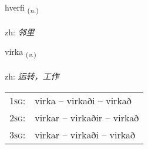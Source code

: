 \documentclass[frontgrid, backgrid]{flacards}\usepackage[]{graphicx}\usepackage[]{color}
\begin{document}
\renewcommand{\flhead}{\vskip5pt \fboxsep=0pt {\small\bfseries\footnotesize Nafnorð | 名词}}
\renewcommand{\fcfoot}{\vskip5pt \fboxsep=0pt \hspace{2pt}{\small\bfseries\footnotesize 2K}}

\renewcommand{\blhead}{\vskip5pt {\small\bfseries\footnotesize Nafnorð | 名词 }}
\renewcommand{\bcfoot}{\vskip5pt \hspace{2pt}{\small\bfseries\footnotesize 2K}}


{hverfi \small{\textsubscript{(\textit{n.})}} \\[1ex] %
\textphonetic{[kʰvɛrvɪ]} \\
zh: \emph{邻里} \\  [2ex]
\renewcommand*{\arraystretch}{0.8}
}

\renewcommand{\flhead}{\vskip5pt \fboxsep=0pt {\small\bfseries\footnotesize Sagnorð | 动词}}
\renewcommand{\fcfoot}{\vskip5pt \fboxsep=0pt \hspace{2pt}{\small\bfseries\footnotesize 2K}}

\renewcommand{\blhead}{\vskip5pt {\small\bfseries\footnotesize Sagnorð | 动词 }}
\renewcommand{\bcfoot}{\vskip5pt \hspace{2pt}{\small\bfseries\footnotesize 2K}}


{virka \small{\textsubscript{(\textit{v.})}} \\[1ex] %
\textphonetic{[vɪr̥ka]} \\
zh: \emph{运转，工作} \\  [2ex]
\renewcommand*{\arraystretch}{0.8}
\begin{tabular}{p{1cm}l}
\textsc{1sg}: & virka -- virkaði -- virkað \\ 
\textsc{2sg}: & virkar -- virkaðir -- virkað \\ 
\textsc{3sg}: & virkar -- virkaði -- virkað \\ 
\end{tabular}
}
\end{document}
